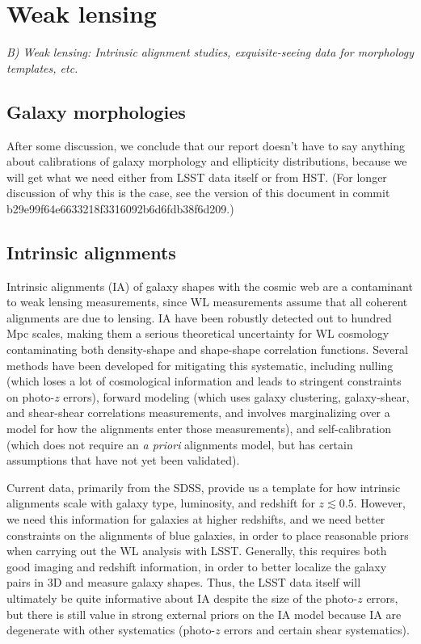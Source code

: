 \section{Weak lensing}
\label{sec:wl}

{\it B) Weak lensing: Intrinsic alignment studies, exquisite-seeing data
for morphology templates, etc.}

\subsection{Galaxy morphologies}

After some discussion, we conclude that our report doesn't have to say anything about calibrations
of galaxy morphology and ellipticity distributions, because we will get what we need either from
LSST data itself or from HST.  (For longer discussion of why this is the case, see the version of
this document in commit b29e99f64e6633218f3316092b6d6fdb38f6d209.)

\subsection{Intrinsic alignments}

Intrinsic alignments (IA) of galaxy shapes with the cosmic web are a contaminant to weak lensing
measurements, since WL measurements assume that all coherent alignments are due to lensing. IA have
been robustly detected out to hundred Mpc scales, making them a serious theoretical uncertainty for
WL cosmology contaminating both density-shape and shape-shape correlation functions.  Several
methods have been developed for mitigating this systematic, including nulling (which loses a lot of
cosmological information and leads to stringent constraints on photo-$z$ errors), forward modeling
(which uses galaxy clustering, galaxy-shear, and shear-shear correlations measurements, and involves
marginalizing over a model for how the alignments enter those measurements), and self-calibration
(which does not require an {\em a priori} alignments model, but has certain assumptions that have
not yet been validated).

Current data, primarily from the SDSS, provide us a template for how intrinsic alignments scale with
galaxy type, luminosity, and redshift for $z\lesssim 0.5$.  However, we need this information for
galaxies at higher redshifts, and we need better constraints on the alignments of blue galaxies, in
order to place reasonable priors when carrying out the WL analysis with LSST. Generally, this
requires both good imaging and redshift information, in order to better localize the galaxy pairs in
3D and measure galaxy shapes.  Thus, the LSST data itself will ultimately be quite informative about
IA despite the size of the photo-$z$ errors, but there is still value in strong external priors on
the IA model because IA are degenerate with other systematics (photo-$z$ errors and certain shear
systematics).

